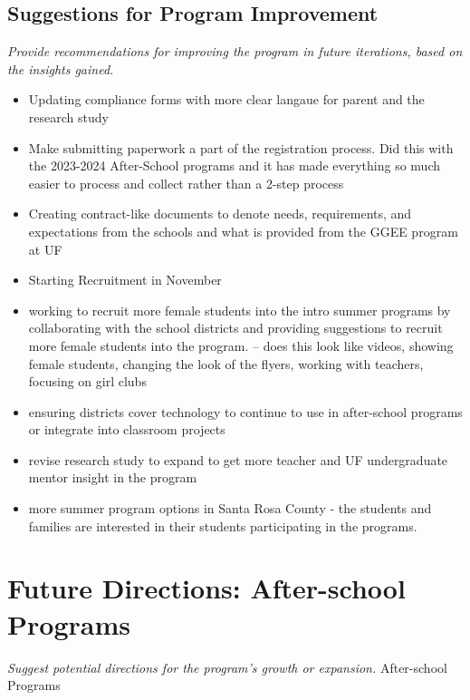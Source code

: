 \documentclass[
]{article}
\providecommand{\tightlist}{%
  \setlength{\itemsep}{0pt}\setlength{\parskip}{0pt}}
\begin{document}
\hypertarget{suggestions-for-program-improvement}{%
\subsection{Suggestions for Program
Improvement}\label{suggestions-for-program-improvement}}

\emph{Provide recommendations for improving the program in future
iterations, based on the insights gained.}

\begin{itemize}
\tightlist
\item
  Updating compliance forms with more clear langaue for parent and the
  research study
\item
  Make submitting paperwork a part of the registration process. Did this
  with the 2023-2024 After-School programs and it has made everything so
  much easier to process and collect rather than a 2-step process
\item
  Creating contract-like documents to denote needs, requirements, and
  expectations from the schools and what is provided from the GGEE
  program at UF
\item
  Starting Recruitment in November
\item
  working to recruit more female students into the intro summer programs
  by collaborating with the school districts and providing suggestions
  to recruit more female students into the program. -- does this look
  like videos, showing female students, changing the look of the flyers,
  working with teachers, focusing on girl clubs
\item
  ensuring districts cover technology to continue to use in after-school
  programs or integrate into classroom projects
\item
  revise research study to expand to get more teacher and UF
  undergraduate mentor insight in the program
\item
  more summer program options in Santa Rosa County - the students and
  families are interested in their students participating in the
  programs.
\end{itemize}

\hypertarget{future-directions-after-school-programs}{%
\section{Future Directions: After-school
Programs}\label{future-directions-after-school-programs}}

\emph{Suggest potential directions for the program's growth or
expansion.} After-school Programs
\end{document}
